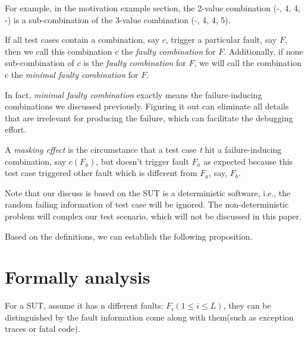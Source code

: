 \documentclass{sig-alternate}
\begin{document}
For example, in the motivation example section, the 2-value combination (-, 4, 4, -) is a sub-combination of the 3-value combination (-, 4, 4, 5).

\begin{definition}
If all test cases contain a combination, say $c$, trigger a particular fault, say $F$, then we call this combination $c$ the \emph{faulty combination} for $F$. Additionally, if none sub-combination of $c$ is the \emph{faulty combination} for $F$, we will call the combination $c$ the \emph{minimal faulty combination} for $F$.

\end{definition}

In fact, \emph{minimal faulty combination} exactly means the failure-inducing combinations we discussed previously. Figuring it out can eliminate all details that are irrelevant for producing the failure, which can facilitate the debugging effort.


\begin{definition}
A \emph{masking effect} is the circumstance that a test case \emph{t} hit a failure-inducing combination, say $c(F_{a})$, but doesn't trigger fault $F_{a}$ as expected because this test case triggered other fault which is different from $F_{a}$, say, $F_{b}$.

\end{definition}

Note that our discuss is based on the SUT is a deterministic software, i.e., the random failing information of test case will be ignored. The non-deterministic problem will complex our test scenario, which will not be discussed in this paper.

Based on the definitions, we can establish the following proposition.




\section{Formally analysis}
For a SUT, assume it has n different faults: $F_{i} ( 1 \leq i \leq L)$, they can be distinguished by the fault information come along with them(such as exception traces or fatal code).
\end{document}
